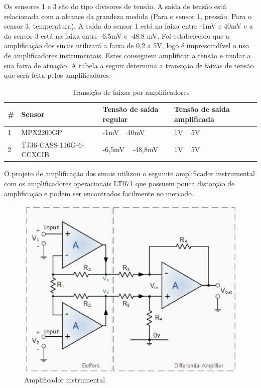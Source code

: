Os sensores 1 e 3 são do tipo divisores de tensão. A saída de tensão está relacionada com a alcance da grandeza medida (Para o sensor 1, pressão. Para o sensor 3, temperatura). A saída do sensor 1 está na faixa entre -1mV e 40mV e a do sensor 3 está na faixa entre -6.5mV e -48.8 mV.
Foi estabelecido que a amplificação dos sinais utilizará a faixa de 0,2 a 5V, logo é imprescindível o uso de amplificadores instrumentais. Estes conseguem amplificar a tensão e mudar a sua faixa de atuação. A tabela a seguir determina a transição de faixas de tensão que será feita pelos amplificadores:

\begin{table}[]
    \centering
    \begin{tabular}{|p{3cm}|p{5cm}|p{3cm}|p{3cm}|}
    \hline
    \textbf{\#} & \textbf{Sensor}    & \textbf{Tensão de saída regular} & \textbf{Tensão de saída amplificada} \\ \hline
    1      & MPX2200GP & -1mV ~ 40mV   & 1V ~ 5V  \\ \hline
    2 & TJ36-CASS-116G-6-CCXCIB & -6,5mV ~ -48,8mV & 1V ~ 5V \\ \hline
    \end{tabular}
    \caption{Transição de faixas por amplificadores}
    \end{table}

O projeto de amplificação dos sinais utilizou o seguinte amplificador instrumental com os amplificadores operacionais LT071 que possuem pouca distorção de amplificação e podem ser encontrados facilmente no mercado.

\begin{figure}[!h]                  
	\centering                          
	\includegraphics[scale=0.5]{figuras/IMG1.eps}
	\caption{ Amplificador instrumental}  \label{figamp1}           
\end{figure}

